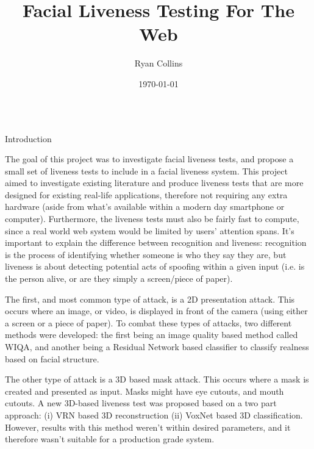 \documentclass[final]{beamer}
\title[Final Year Project Poster]{Facial Liveness Testing For The Web}
\author[R Collins]{Ryan Collins}
\institute[Durham]{Department of Computer Science, Durham University}
\date{\today}
\begin{document}
  \begin{frame}{} 

  \vfill
    \begin{columns}[t]
      \begin{column}{.48\linewidth}
        \begin{block}{Introduction}
         
            The goal of this project was to investigate facial liveness tests, and propose a small set of liveness tests to include in a facial liveness system. This project aimed to investigate
            existing literature and produce liveness tests that are more designed for existing real-life applications, therefore not requiring any extra hardware (aside from what's available within
            a modern day smartphone or computer). Furthermore, the liveness tests must also be fairly fast to compute, since a real world web system would be limited by users' attention spans.
            It's important to explain the difference between recognition and liveness: recognition is the process of identifying whether someone is who they say they are, but liveness is
            about detecting potential acts of spoofing within a given input (i.e. is the person alive, or are they simply a screen/piece of paper).

            The first, and most common type of attack, is a 2D presentation attack. This occurs where an image, or video, is displayed in front of the camera (using either a screen or a piece of paper).
            To combat these types of attacks, two different methods were developed: the first being an image quality based method called WIQA, and another being a Residual Network based classifier
            to classify realness based on facial structure.

            The other type of attack is a 3D based mask attack. This occurs where a mask is created and presented as input. Masks might have eye cutouts, and mouth cutouts. 
            A new 3D-based liveness test was proposed based on a two part approach: (i) VRN based 3D reconstruction (ii) VoxNet based 3D classification. However, results with
            this method weren't within desired parameters, and it therefore wasn't suitable for a production grade system.

        \end{block}


\end{column}
\end{columns}
\end{frame}
\end{document}
